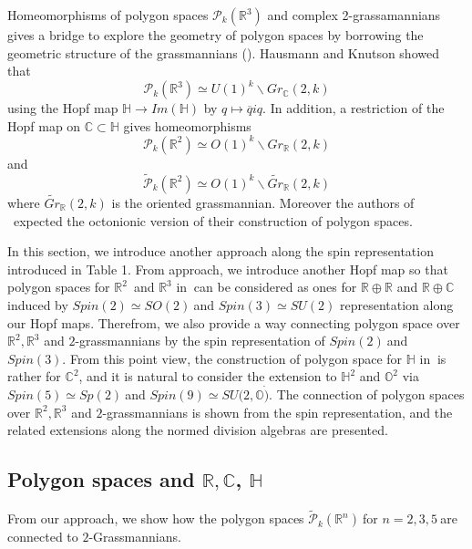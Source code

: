 \documentclass[a4paper]{article}%
\begin{document}
Homeomorphisms of polygon spaces $\mathcal{P}_{k}(\mathbb{R}^{3})$ and complex
2-grassamannians gives a bridge to explore the geometry of polygon spaces by
borrowing the geometric structure of the grassmannians (\cite{HK}). Hausmann
and Knutson showed that
\[
\mathcal{P}_{k}(\mathbb{R}^{3})\simeq U(1)^{k}\backslash Gr_{\mathbb{C}}(2,k)
\]
using the Hopf map $\mathbb{H}\rightarrow Im(\mathbb{H})$ by $q\mapsto
\overline{q}iq$. In addition, a restriction of the Hopf map on $\mathbb{C}%
\subset\mathbb{H}$ gives homeomorphisms
\[
\mathcal{P}_{k}(\mathbb{R}^{2})\simeq O(1)^{k}\backslash Gr_{\mathbb{R}}(2,k)
\]
and
\[
\widetilde{\mathcal{P}}_{k}(\mathbb{R}^{2})\simeq O(1)^{k}\backslash
\widetilde{Gr}_{\mathbb{R}}(2,k)
\]
where $\widetilde{Gr}_{\mathbb{R}}(2,k)$ is the oriented grassmannian.
Moreover the authors of \cite{HK}\ expected the octonionic version of their
construction of polygon spaces.

In this section, we introduce another approach along the spin representation
introduced in Table 1. From approach, we introduce another Hopf map so that
polygon spaces for $\mathbb{R}^{2}$\ and $\mathbb{R}^{3}$ in \cite{HK}$\ $can
be considered as ones for $\mathbb{R}\oplus\mathbb{R}$ and $\mathbb{R}%
\oplus\mathbb{C}$ induced by $Spin\left(  2\right)  \simeq SO(2)\ $and
$Spin\left(  3\right)  \simeq SU(2)$ representation along our Hopf maps.
Therefrom, we also provide a way connecting polygon space over $\mathbb{R}%
^{2},\mathbb{R}^{3}$ and $2$-grassmannians by the spin representation of
$Spin\left(  2\right)  \ $and $Spin\left(  3\right)  $. From this point view,
the construction of polygon space for $\mathbb{H}$ in \cite{HK}$\ $is rather
for $\mathbb{C}^{2}$, and it is natural to consider the extension to
$\mathbb{H}^{2}$ and $\mathbb{O}^{2}$ via $Spin\left(  5\right)  \simeq
Sp(2)\ $and $Spin\left(  9\right)  \simeq SU(2,\mathbb{O}\dot{)}$. The
connection of polygon spaces over $\mathbb{R}^{2},\mathbb{R}^{3}$ and
$2$-grassmannians is shown from the spin representation, and the related
extensions along the normed division algebras are presented.

\subsection{Polygon spaces and $\mathbb{R},\mathbb{C}$, $\mathbb{H}$}

From our approach, we show how the polygon spaces $\widetilde{\mathcal{P}}%
_{k}(\mathbb{R}^{n})\ $for $n=2,3,5\ $are connected to $2$-Grassmannians.
\end{document}
